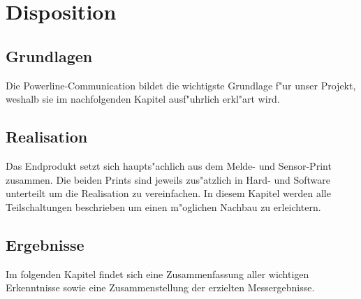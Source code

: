 \section{Disposition}

\subsection{Grundlagen}
Die Powerline-Communication bildet die wichtigste Grundlage f"ur unser Projekt, weshalb sie im nachfolgenden Kapitel ausf"uhrlich erkl"art wird. 
\subsection{Realisation}
Das Endprodukt setzt sich haupts"achlich aus dem Melde- und Sensor-Print zusammen. Die beiden Prints sind jeweils zus"atzlich in Hard- und Software unterteilt um die Realisation zu vereinfachen. In diesem Kapitel werden alle Teilschaltungen beschrieben um einen m"oglichen Nachbau zu erleichtern. 
\subsection{Ergebnisse}
Im folgenden Kapitel findet sich eine Zusammenfassung aller wichtigen Erkenntnisse sowie eine Zusammenstellung der erzielten Messergebnisse.  
